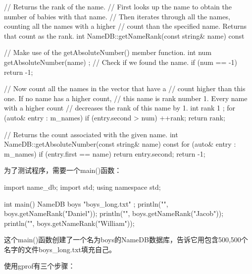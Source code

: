 \begin{cpp}
// Returns the rank of the name.
// First looks up the name to obtain the number of babies with that name.
// Then iterates through all the names, counting all the names with a higher
// count than the specified name. Returns that count as the rank.
int NameDB::getNameRank(const string& name) const
{
    // Make use of the getAbsoluteNumber() member function.
    int num { getAbsoluteNumber(name) };
    // Check if we found the name.
    if (num == -1) {
        return -1;
    }

    // Now count all the names in the vector that have a
    // count higher than this one. If no name has a higher count,
    // this name is rank number 1. Every name with a higher count
    // decreases the rank of this name by 1.
    int rank { 1 };
    for (auto& entry : m_names) {
        if (entry.second > num) {
            ++rank;
        }
    }
    return rank;
}

// Returns the count associated with the given name.
int NameDB::getAbsoluteNumber(const string& name) const
{
    for (auto& entry : m_names) {
        if (entry.first == name) {
            return entry.second;
        }
    }
    return -1;
}
\end{cpp}


为了测试程序，需要一个main()函数：

\begin{cpp}
import name_db;
import std;
using namespace std;

int main()
{
    NameDB boys { "boys_long.txt" };
    println("{}", boys.getNameRank("Daniel"));
    println("{}", boys.getNameRank("Jacob"));
    println("{}", boys.getNameRank("William"));
}
\end{cpp}

这个main()函数创建了一个名为boys的NameDB数据库，告诉它用包含500,500个名字的文件boys\_long.txt填充自己。

使用gprof有三个步骤：

